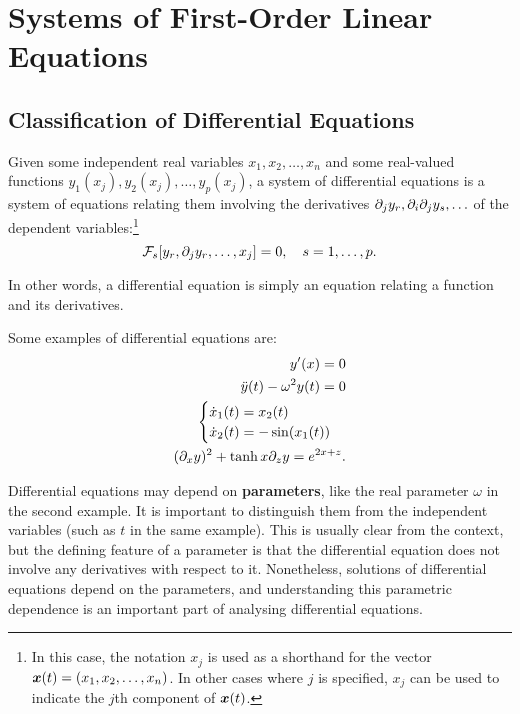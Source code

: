 \section{Systems of First-Order Linear Equations}\label{sec:firstorder}

\subsection{Classification of Differential Equations}

\begin{definition}
	Given some independent real variables $x_1, x_2, \ldots, x_n$ and some real-valued functions $y_1(x_j), y_2(x_j), \ldots, y_p(x_j)$, a system of differential equations is a system of equations relating them involving the derivatives $\partial_j y_r, \partial_i\partial_j y_s, \ldots$ of the dependent variables:\footnote{In this case, the notation $x_j$ is used as a shorthand for the vector $\bm{x}(t) = (x_1, x_2, \ldots, x_n)$. In other cases where $j$ is specified, $x_j$ can be used to indicate the $j$th component of $\bm{x}(t)$.}
	\[
		\mathcal{F}_s[y_r, \partial_j y_r, \ldots, x_j] = 0, \quad s = 1, \ldots, p.
	\]
\end{definition}

In other words, a differential equation is simply an equation relating a function and its derivatives.

\begin{eg}
	Some examples of differential equations are:
	\begin{equation*}
	\begin{split}
		y'(x) = 0 \\
		\ddot{y}(t) - \omega^2 y(t) = 0 \\
		\begin{cases} \dot{x}_1(t) = x_2(t) \\ \dot{x}_2(t) = -\sin(x_1(t)) \end{cases} \\
		(\partial_x y)^2 + \tanh{x}\partial_z y = e^{2x+z}.
	\end{split}
	\end{equation*}
\end{eg}

Differential equations may depend on \textbf{parameters}, like the real parameter $\omega$ in the second example. It is important to distinguish them from the independent variables (such as $t$ in the same example). This is usually clear from the context, but the defining feature of a parameter is that the differential equation does not involve any derivatives with respect to it. Nonetheless, solutions of differential equations depend on the parameters, and understanding this parametric dependence is an important part of analysing differential equations.


